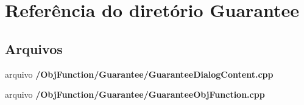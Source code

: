 \section{Referência do diretório Guarantee}
\label{dir_8178ee700259edb66f4c98d696c55935}
\subsection*{Arquivos}
\begin{DoxyCompactItemize}
\item 
arquivo {\bf /\+Obj\+Function/\+Guarantee/\+Guarantee\+Dialog\+Content.\+cpp}
\item 
arquivo {\bf /\+Obj\+Function/\+Guarantee/\+Guarantee\+Obj\+Function.\+cpp}
\end{DoxyCompactItemize}
